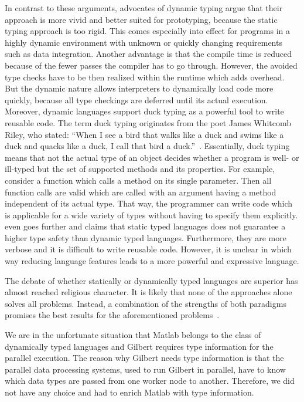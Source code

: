 In contrast to these arguments, advocates of dynamic typing argue that their approach is more vivid and better suited for prototyping, because the static typing approach is too rigid.
This comes especially into effect for programs in a highly dynamic environment with unknown or quickly changing requirements such as data integration.
Another advantage is that the compile time is reduced because of the fewer passes the compiler has to go through.
However, the avoided type checks have to be then realized within the runtime which adds overhead.
But the dynamic nature allows interpreters to dynamically load code more quickly, because all type checkings are deferred until its actual execution.
Moreover, dynamic languages support duck typing as a powerful tool to write reusable code.
The term duck typing originates from the poet James Whitcomb Riley, who stated: \enquote{When I see a bird that walks like a duck and swims like a duck and quacks like a duck, I call that bird a duck.}~\cite{heim:2007a}.
Essentially, duck typing means that not the actual type of an object decides whether a program is well- or ill-typed but the set of supported methods and its properties.
For example, consider a function which calls a method  on its single parameter.
Then all function calls are valid which are called with an argument having a method  independent of its actual type.
That way, the programmer can write code which is applicable for a wide variety of types without having to specify them explicitly.
\textcite{ousterhout:c1998a} even goes further and claims that static typed languages does not guarantee a higher type safety than dynamic typed languages.
Furthermore, they are more verbose and it is difficult to write reusable code.
However, it is unclear in which way reducing language features leads to a more powerful and expressive language. 

The debate of whether statically or dynamically typed languages are superior has almost reached religious character.
It is likely that none of the approaches alone solves all problems.
Instead, a combination of the strengths of both paradigms promises the best results for the aforementioned problems~\cite{meijer:2004a}.

We are in the unfortunate situation that Matlab belongs to the class of dynamically typed languages and Gilbert requires type information for the parallel execution.
The reason why Gilbert needs type information is that the parallel data processing systems, used to run Gilbert in parallel, have to know which data types are passed from one worker node to another.
Therefore, we did not have any choice and had to enrich Matlab with type information.

